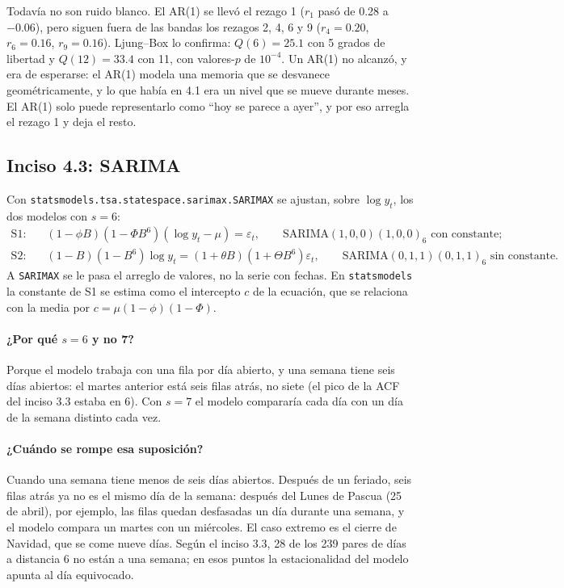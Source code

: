 \begin{table}[H]
  \centering
  \small
  \caption{Ljung--Box sobre los residuos de cada etapa. Los grados de
  libertad restan los parámetros de memoria estimados: uno para el AR(1) y
  dos para S1 y S2.}
  \label{tab:p4_lb}
\end{table}

Todavía no son ruido blanco. El AR(1) se llevó el rezago 1 ($r_1$ pasó de
0.28 a $-0.06$), pero siguen fuera de las bandas los rezagos 2, 4, 6 y 9
($r_4=0.20$, $r_6=0.16$, $r_9=0.16$). Ljung--Box lo confirma: $Q(6)=25.1$ con 5
grados de libertad y $Q(12)=33.4$ con 11, con valores-$p$ de $10^{-4}$. Un
AR(1) no alcanzó, y era de esperarse: el AR(1) modela una memoria que se
desvanece geométricamente, y lo que había en 4.1 era un nivel que se mueve
durante meses. El AR(1) solo puede representarlo como ``hoy se parece a
ayer'', y por eso arregla el rezago 1 y deja el resto.

\subsection{Inciso 4.3: SARIMA}

Con \texttt{statsmodels.tsa.statespace.sarimax.SARIMAX} se ajustan, sobre
$\log y_t$, los dos modelos con $s=6$:
\begin{align*}
  \text{S1:}\quad & (1-\phi B)(1-\Phi B^6)(\log y_t - \mu) = \varepsilon_t,
    \qquad\text{SARIMA}(1,0,0)(1,0,0)_6 \text{ con constante;}\\
  \text{S2:}\quad & (1-B)(1-B^6)\log y_t = (1+\theta B)(1+\Theta B^6)\varepsilon_t,
    \qquad\text{SARIMA}(0,1,1)(0,1,1)_6 \text{ sin constante.}
\end{align*}
A \texttt{SARIMAX} se le pasa el arreglo de valores, no la serie con fechas.
En \texttt{statsmodels} la constante de S1 se estima como el intercepto $c$
de la ecuación, que se relaciona con la media por
$c=\mu(1-\phi)(1-\Phi)$.

\paragraph{¿Por qué $s=6$ y no 7?} Porque el modelo trabaja con una fila por
día abierto, y una semana tiene seis días abiertos: el martes anterior está
seis filas atrás, no siete (el pico de la ACF del inciso 3.3 estaba en 6). Con
$s=7$ el modelo compararía cada día con un día de la semana distinto cada vez.

\paragraph{¿Cuándo se rompe esa suposición?} Cuando una semana tiene menos de
seis días abiertos. Después de un feriado, seis filas atrás ya no es el mismo
día de la semana: después del Lunes de Pascua (25 de abril), por ejemplo, las
filas quedan desfasadas un día durante una semana, y el modelo compara un
martes con un miércoles. El caso extremo es el cierre de Navidad, que se come
nueve días. Según el inciso 3.3, 28 de los 239 pares de días a distancia 6 no
están a una semana; en esos puntos la estacionalidad del modelo apunta al día
equivocado.

